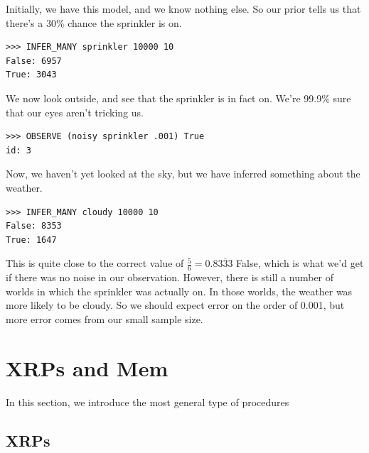 \documentclass[10pt]{article}
\begin{document}
Initially, we have this model, and we know nothing else.  So our prior tells us that there's a 30\% chance the sprinkler is on.

\begin{leftbar} \begin{small} \begin{verbatim}
>>> INFER_MANY sprinkler 10000 10
False: 6957
True: 3043
\end{verbatim} \end{small} \end{leftbar}

\noindent We now look outside, and see that the sprinkler is in fact on.  We're 99.9\% sure that our eyes aren't tricking us.  

\begin{leftbar} \begin{small} \begin{verbatim}
>>> OBSERVE (noisy sprinkler .001) True
id: 3
\end{verbatim} \end{small} \end{leftbar}

\noindent Now, we haven't yet looked at the sky, but we have inferred something about the weather.  

\begin{leftbar} \begin{small} \begin{verbatim}
>>> INFER_MANY cloudy 10000 10
False: 8353
True: 1647
\end{verbatim} \end{small} \end{leftbar}

This is quite close to the correct value of $\frac{5}{6} = 0.8\overline{333}$ False, which is what we'd get if there was no noise in our observation.  However, there is still a number of worlds in which the sprinkler was actually on.  In those worlds, the weather was more likely to be cloudy.  So we should expect error on the order of 0.001, but more error comes from our small sample size.  \vspace{6 pt}

\section{XRPs and Mem}

In this section, we introduce the most general type of procedures 

\subsection{XRPs}
\end{document}
